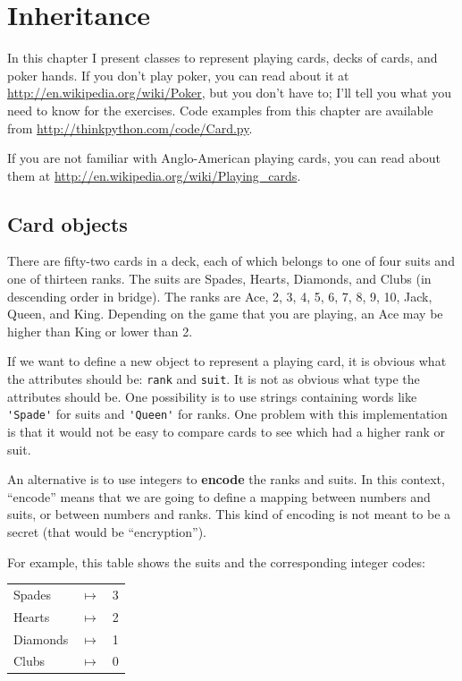 \documentclass[12pt,a4paper,final,twoside,onecolumn,titlepage]{book}
\begin{document}
\chapter{Inheritance}

In this chapter I present classes to represent playing cards,
decks of cards, and poker hands.  If you don't play poker, you can
read about it at \url{http://en.wikipedia.org/wiki/Poker}, but you don't have
to; I'll tell you what you need to know for the exercises.
Code examples from this chapter are available from
\url{http://thinkpython.com/code/Card.py}.

If you are not familiar with Anglo-American playing cards,
you can read about them at \url{http://en.wikipedia.org/wiki/Playing_cards}.


\section{Card objects}

There are fifty-two cards in a deck, each of which belongs to one of
four suits and one of thirteen ranks.  The suits are Spades, Hearts,
Diamonds, and Clubs (in descending order in bridge).  The ranks are
Ace, 2, 3, 4, 5, 6, 7, 8, 9, 10, Jack, Queen, and King.  Depending on
the game that you are playing, an Ace may be higher than King
or lower than 2.

If we want to define a new object to represent a playing card, it is
obvious what the attributes should be: {\tt rank} and
{\tt suit}.  It is not as obvious what type the attributes
should be.  One possibility is to use strings containing words like
\verb"'Spade'" for suits and \verb"'Queen'" for ranks.  One problem with
this implementation is that it would not be easy to compare cards to
see which had a higher rank or suit.

An alternative is to use integers to {\bf encode} the ranks and suits.
In this context, ``encode'' means that we are going to define a mapping
between numbers and suits, or between numbers and ranks.  This
kind of encoding is not meant to be a secret (that
would be ``encryption'').

\newcommand{\mymapsto}{$\mapsto$}

For example, this table shows the suits and the corresponding integer
codes:

\begin{tabular}{l c l}
Spades & \mymapsto & 3 \\
Hearts & \mymapsto & 2 \\
Diamonds & \mymapsto & 1 \\
Clubs & \mymapsto & 0
\end{tabular}
\end{document}
